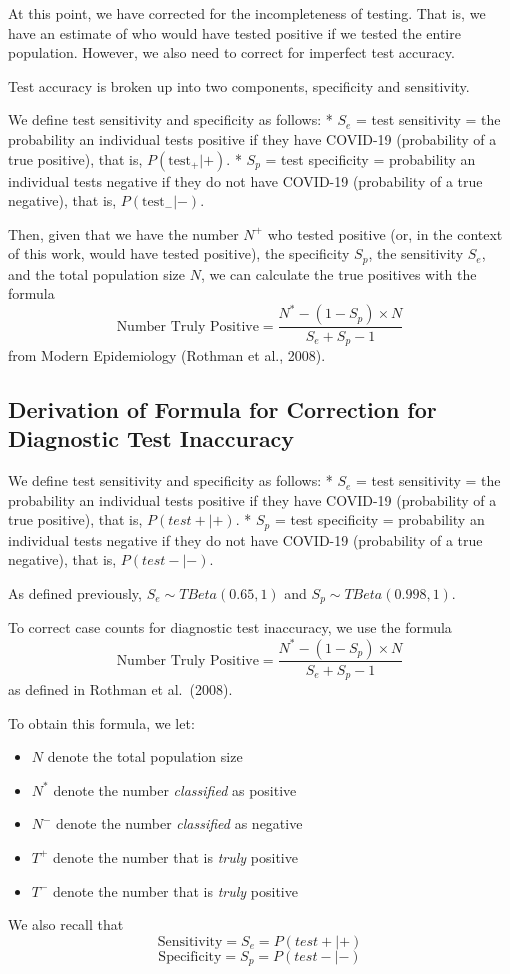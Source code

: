 \documentclass[12pt,twoside]{smiththesis}
\providecommand{\tightlist}{%
  \setlength{\itemsep}{0pt}\setlength{\parskip}{0pt}}
\begin{document}
At this point, we have corrected for the incompleteness of testing. That is, we have an estimate of who would have tested positive if we tested the entire population. However, we also need to correct for imperfect test accuracy.

Test accuracy is broken up into two components, specificity and sensitivity.

We define test sensitivity and specificity as follows:
* \(S_e\) = test sensitivity = the probability an individual tests positive if they have COVID-19 (probability of a true positive), that is, \(P(\text{test}_+ | +)\).
* \(S_p\) = test specificity = probability an individual tests negative if they do not have COVID-19 (probability of a true negative), that is, \(P(\text{test}_- |-)\).

Then, given that we have the number \(N^+\) who tested positive (or, in the context of this work, would have tested positive), the specificity \(S_p\), the sensitivity \(S_e\), and the total population size \(N\), we can calculate the true positives with the formula
\[\text{Number Truly Positive} = \dfrac{N^* - (1-S_p) \times N}{S_e+S_p-1}\]
from Modern Epidemiology (Rothman et al., 2008).

\hypertarget{derivation-of-formula-for-correction-for-diagnostic-test-inaccuracy}{%
\subsection{Derivation of Formula for Correction for Diagnostic Test Inaccuracy}\label{derivation-of-formula-for-correction-for-diagnostic-test-inaccuracy}}

We define test sensitivity and specificity as follows:
* \(S_e\) = test sensitivity = the probability an individual tests positive if they have COVID-19 (probability of a true positive), that is, \(P(test + | +)\).
* \(S_p\) = test specificity = probability an individual tests negative if they do not have COVID-19 (probability of a true negative), that is, \(P(test - |-)\).

As defined previously, \(S_e \sim TBeta(0.65, 1)\) and \(S_p \sim TBeta(0.998, 1)\).

To correct case counts for diagnostic test inaccuracy, we use the formula
\[\text{Number Truly Positive} = \dfrac{N^*- (1-S_p) \times N}{S_e+S_p-1}\]
as defined in Rothman et al.~(2008).

To obtain this formula, we let:
\begin{itemize}
\tightlist
\item
  \(N\) denote the total population size
\item
  \(N^*\) denote the number \emph{classified} as positive
\item
  \(N^-\) denote the number \emph{classified} as negative
\item
  \(T^+\) denote the number that is \emph{truly} positive
\item
  \(T^-\) denote the number that is \emph{truly} positive
\end{itemize}
We also recall that
\[ \text{Sensitivity} = S_e = P(test + | +) \]
\[ \text{Specificity} = S_p = P(test - | - ) \]
\end{document}
